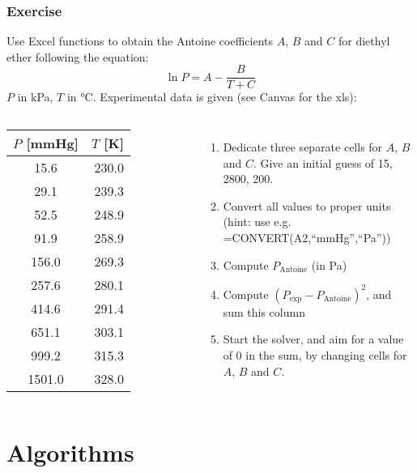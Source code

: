 \begin{frame}
  \frametitle{Exercise}
  \footnotesize\selectfont
  Use Excel functions to obtain the Antoine coefficients $A$, $B$ and $C$ for diethyl ether following the equation:
  \[
    \ln P = A - \frac{B}{T+C}
  \]
  $P$ in \si{\kilo\pascal}, $T$ in \si{\celsius}. Experimental data is given (see Canvas for the xls):
  \begin{columns}
    \begin{longtable}{c|r}
      $P$ [\si{\mmHg}]& $T$ [\si{\kelvin}] \\ \hline
      15.6   & 230.0\\
      29.1   & 239.3\\
      52.5   & 248.9\\
      91.9   & 258.9\\
      156.0  & 269.3\\
      257.6  & 280.1\\
      414.6  & 291.4\\
      651.1  & 303.1\\
      999.2  & 315.3\\
      1501.0 & 328.0\\ \hline
    \end{longtable}
  \pause
    \begin{enumerate}
      \item Dedicate three separate cells for $A$, $B$ and $C$. Give an initial guess of 15, 2800, 200.\pause
      \item Convert all values to proper units (hint: use e.g. =CONVERT(A2,``mmHg'',``Pa''))\pause
      \item Compute $P_\text{Antoine}$ (in \si{\pascal})\pause
      \item Compute $(P_\text{exp} - P_\text{Antoine})^2$, and sum this column\pause
      \item Start the solver, and aim for a value of 0 in the sum, by changing cells for $A$, $B$ and $C$.
    \end{enumerate}
  \end{columns}
\end{frame}

\section{Algorithms}
